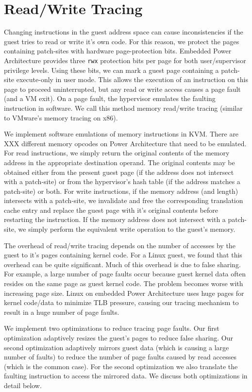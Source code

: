 \documentclass[10pt,twocolumn]{article}
\begin{document}
\section{Read/Write Tracing}
\label{sec:tracing}
Changing instructions in the guest address space can cause
inconsistencies if the guest tries to read or write it's own code.
For this reason, we protect the pages containing patch-sites with hardware
page-protection bits. Embedded Power Architecture provides three {\tt rwx}
protection bits per page for both user/supervisor privilege levels. Using these
bits, we can mark a guest page containing a patch-site
execute-only in user mode. This allows the
execution of an instruction on this page to proceed uninterrupted,
but any read or write access causes a page fault (and a VM exit).
On a page fault, the hypervisor
emulates the faulting instruction in software. We call this
method memory read/write tracing (similar to VMware's memory tracing
on x86\cite{agesen:comparison}).

We implement software emulations of memory instructions in KVM. There are XXX
different memory opcodes on Power Architecture that need to be emulated.
For read instructions, we simply return the original contents of the memory
address in the appropriate destination
operand. The original contents may be obtained either from the present guest
page (if the address does not intersect with a patch-site) or from the hypervisor's
hash table (if the address matches a patch-site) or both.
For write instructions, if the memory address (and length) intersects with a patch-site,
we invalidate and free the corresponding translation cache
entry and replace the guest page with it's original contents before
restarting the instruction. If the memory address does not intersect with a
patch-site, we simply perform the equivalent write operation to the guest's memory.

The overhead of read/write tracing depends on the number of accesses by the guest
to it's pages containing kernel code. For a Linux guest, we found that this overhead
can be quite significant.
Much of this overhead is due to false sharing. For example, a large number of page
faults occur because guest kernel data often resides on the same page as
guest kernel code. The problem becomes worse with increasing page size. Linux
on embedded
Power Architecture uses huge pages for kernel code/data to minimize
TLB pressure, causing our tracing mechanism to result in a huge number of page
faults.

We implement two optimizations to reduce tracing page faults. Our first optimization
adaptively resizes the guest's pages to reduce false sharing.
Our second optimization adaptively
mirrors guest data (which is causing a large number of faults) to reduce the number
of page faults caused by read accesses (which is the common case). For the second
optimization we also translate the faulting instruction to access the mirrored data.
We discuss both optimizations in detail below.
\end{document}
